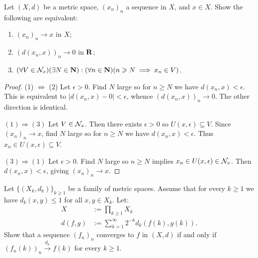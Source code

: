 \documentclass[11pt,twoside,openany]{memoir}
\begin{document}
    \begin{exercise}
        Let $(X,d)$ be a metric space, $(x_n)_n$ a sequence in $X$, and $x \in X$. Show the following are equivalent:
            \begin{enumerate}[label = (\arabic*),itemsep=1pt,topsep=3pt]
                \item $(x_n)_n \rightarrow x$ in $X$;
                \item $(d(x_n,x))_n \rightarrow 0$ in $\mathbf{R}$;
                \item $(\forall V \in \mathcal{N}_x)(\exists N \in \mathbf{N}):(\forall n \in \mathbf{N})(n \geqslant N \implies x_n \in V)$.
            \end{enumerate}
    \end{exercise}
        \begin{proof}
            (1) $\Leftrightarrow$ (2) Let $\epsilon > 0$. Find $N$ large so for $n \geq N$ we have $d(x_n,x) < \epsilon$. This is equivalent to $|d(x_n,x) - 0| < \epsilon$, whence $(d(x_n,x))_n \rightarrow 0$. The other direction is identical.

            $(1) \Rightarrow (3)$ Let $V \in \mathcal{N}_x$. Then there exists $\epsilon > 0$ so $U(x,\epsilon) \subseteq V$. Since $(x_n)_n \rightarrow x$, find $N$ large so for $n \geq N$ we have $d(x_n,x) < \epsilon$. Thus $x_n \in U(x,\epsilon) \subseteq V$.

            $(3) \Rightarrow (1)$ Let $\epsilon > 0$. Find $N$ large so $n \geq N$ implies $x_n \in U(x, \epsilon) \in \mathcal{N}_x$. Then $d(x_n,x) < \epsilon$, giving $(x_n)_n \rightarrow x$.
        \end{proof}
    \iffalse
    \newpage
    \begin{exercise}
        Let $X$ be a metric space and $x_0 \in X$. Show that a sequence $(x_n)_n$ converges to $x_0$ in $X$ if and only if every subsequence $(x_{n_k})_k$ admits a subsequence $(x_{n_{k_j}})_j$ with $(x_{n_{k_j}})_j \rightarrow x_0$.
    \end{exercise}
    \fi
    \addtocounter{exercise}{1}
    \begin{exercise}
        Let $\{(X_k,d_k)\}_{k \geq 1}$ be a family of metric spaces. Assume that for every $k \geq 1$ we have $d_k(x,y) \leq 1$ for all $x,y \in X_k$. Let:
            \begin{equation*}
            \begin{split}
                X&:=\prod_{k \geq 1}X_k \\
                d(f,g) &:= \sum_{k = 1}^\infty 2^{-k}d_k(f(k),g(k)).
            \end{split}
            \end{equation*}
        Show that a sequence $(f_n)_n$ converges to $f$ in $(X,d)$ if and only if $(f_n(k))_n \xrightarrow{d_k}f(k)$ for every $k \geq 1$.
    \end{exercise}
\end{document}
